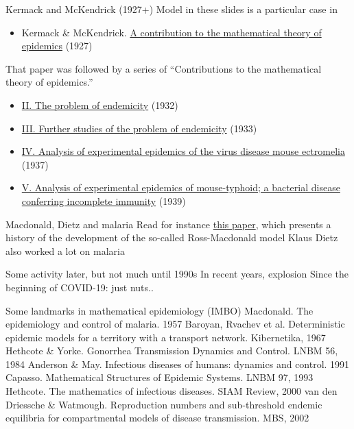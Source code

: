 \documentclass[aspectratio=169]{beamer}\usepackage[]{graphicx}\usepackage[]{xcolor}
\begin{document}
\begin{frame}{Kermack and McKendrick (1927+)}
Model in these slides is a particular case in
\begin{itemize}
  \item Kermack \& McKendrick. \href{https://doi.org/10.1098/rspa.1927.0118}{A contribution to the mathematical theory of epidemics} (1927)
\end{itemize}
\vfill
That paper was followed by a series of ``Contributions to the mathematical theory of epidemics.''
\begin{itemize}
  \item \href{https://doi.org/10.1098/rspa.1932.0171}{II. The problem of endemicity} (1932)
  \item \href{https://doi.org/10.1098/rspa.1933.0106}{III. Further studies of the problem of endemicity} (1933)
  \item \href{https://doi.org/10.1017/S0022172400034902}{IV. Analysis of experimental epidemics of the virus disease mouse ectromelia} (1937)
  \item \href{https://doi.org/10.1017/S0022172400011918}{V. Analysis of experimental epidemics of mouse-typhoid; a bacterial disease conferring incomplete immunity} (1939)
\end{itemize}
\end{frame}


\begin{frame}{Macdonald, Dietz and malaria}
\bbullet Read for instance \href{https://doi.org/10.1371/journal.ppat.1002588}{this paper}, which presents a history of the development of the so-called Ross-Macdonald model
\vfill
\bbullet Klaus Dietz also worked a lot on malaria
\end{frame}
    
    
\begin{frame}{Some activity later, but not much until 1990s}
\bbullet In recent years, explosion
\vfill
\bbullet Since the beginning of COVID-19: just nuts..
\end{frame}

\begin{frame}{Some landmarks in mathematical epidemiology (IMBO)}
\bbullet Macdonald. The epidemiology and control of malaria. 1957
\vfill
\bbullet Baroyan, Rvachev et al. Deterministic epidemic models for a territory with a transport network. Kibernetika, 1967
\vfill
\bbullet Hethcote \& Yorke. Gonorrhea Transmission Dynamics and Control. LNBM 56, 1984
\vfill
\bbullet Anderson \& May. Infectious diseases of humans: dynamics and control. 1991
\vfill
\bbullet Capasso. Mathematical Structures of Epidemic Systems. LNBM 97, 1993
\vfill
\bbullet Hethcote. The mathematics of infectious diseases. SIAM Review, 2000
\vfill
\bbullet van den Driessche \& Watmough. Reproduction numbers and sub-threshold endemic equilibria for compartmental models of disease transmission. MBS, 2002      
\end{frame}
\end{document}
